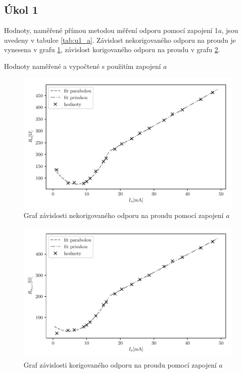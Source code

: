 \documentclass[0-protokol.tex]{subfiles}
\begin{document}
\subsection*{Úkol 1}
Hodnoty, naměřené přímou metodou měření odporu pomocí zapojení 1$a$, jsou uvedeny v tabulce \ref{tab:u1_a}. Závislost nekorigovaného odporu na proudu je vynesena v grafu \ref{fig:u1_a}, závislost korigovaného odporu na proudu v grafu \ref{fig:u1_a_kor}.
\begin{table}[H] 
\centering
\setlength{\tabcolsep}{10pt}

\caption{Hodnoty naměřené a vypočtené s použitím zapojení $a$}
\label{tab:u1_a}
\end{table}

\begin{figure}[H] 
\centering
\includegraphics[]{plot/u1_a2}
\caption{Graf závislosti nekorigovaného odporu na proudu pomocí zapojení $a$}
\label{fig:u1_a}
\end{figure}

\begin{figure}[H] 
\centering
\includegraphics[]{plot/u1_a_kor2}
\caption{Graf závislosti korigovaného odporu na proudu pomocí zapojení $a$}
\label{fig:u1_a_kor}
\end{figure}
\end{document}
